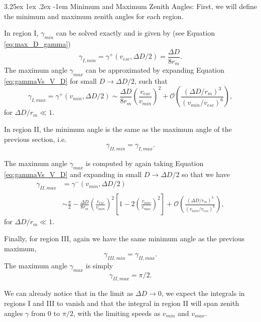 \documentclass{hitec}
\makeatletter
\numberwithin{equation}{section}
\renewcommand\paragraph{\@startsection{paragraph}{5}{\z@}%
	{3.25ex \@plus1ex \@minus.2ex}%
	{-1em}%
	{\normalfont\normalsize\bfseries}}
\makeatother
\begin{document}
\paragraph{Minimum and Maximum Zenith Angles:}
First, we will define the minimum and maximum zenith angles for each region.

In region I, $\gamma_{min}$ can be solved exactly and is given by (see Equation \eqref{eq:max_D_gamma})
\begin{equation}
\gamma_{I,min} = \gamma^+(v_{esc},\Delta D/2) = \frac{\Delta D}{8r_m}.
\end{equation}
The maximum angle $\gamma_{max}$ can be approximated by expanding Equation \eqref{eq:gammaVs_V_D} for small $D\to\Delta D/2$, such that
\begin{equation}
\gamma_{I,max} = \gamma^+(v_{min}, \Delta D/2) \sim \frac{\Delta D}{8r_m}\left(\frac{v_{esc}}{v_{min}}\right)^2 + \mathcal{O}\left(\frac{(\Delta D/r_m)^3}{(v_{min}/v_{esc})^6}\right),
\end{equation}
for $\Delta D/r_m \ll 1$.


In region II, the minimum angle is the same as the maximum angle of the previous section, i.e.
\begin{equation}
\gamma_{II,min} = \gamma_{I,max}.
\end{equation}

The maximum angle $\gamma_{max}$ is computed by again taking Equation \eqref{eq:gammaVs_V_D} and expanding in small $D\to\Delta D/2$ so that we have
\begin{align}
\gamma_{II,max} &= \gamma^-(v_{min}, \Delta D/2)\\
 &\sim \frac{\pi}{2} - \frac{\Delta D}{8r_m}\left(\frac{v_{esc}}{v_{min}}\right)^2\left[1-2\left(\frac{v_{min}}{v_{max}}\right)^2\right] + \mathcal{O}\left(\frac{(\Delta D/r_m)^3}{(v_{min}/v_{esc})^6}\right),
\end{align}
for $\Delta D/r_m \ll 1$.

Finally, for region III, again we have the same minimum angle as the previous maximum,
\begin{equation}
\gamma_{III,min} = \gamma_{II,max}.
\end{equation}
The maximum angle $\gamma_{max}$ is simply
\begin{equation}
\gamma_{II,max} = \pi/2.
\end{equation}

We can already notice that in the limit as $\Delta D \to 0$, we expect the integrals in regions I and III to vanish and that the integral in region II will span zenith angles $\gamma$ from $0$ to $\pi/2$, with the limiting speeds as $v_{min}$ and $v_{max}$.
\end{document}
